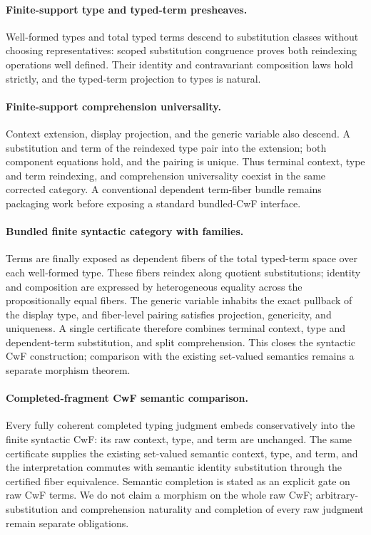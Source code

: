 \documentclass[11pt]{article}
\theoremstyle{definition}
\begin{document}
\paragraph{Finite-support type and typed-term presheaves.}
Well-formed types and total typed terms descend to substitution classes without
choosing representatives: scoped substitution congruence proves both
reindexing operations well defined. Their identity and contravariant
composition laws hold strictly, and the typed-term projection to types is
natural.

\paragraph{Finite-support comprehension universality.}
Context extension, display projection, and the generic variable also descend.
A substitution and term of the reindexed type pair into the extension; both
component equations hold, and the pairing is unique. Thus terminal context,
type and term reindexing, and comprehension universality coexist in the same
corrected category. A conventional dependent term-fiber bundle remains
packaging work before exposing a standard bundled-CwF interface.

\paragraph{Bundled finite syntactic category with families.}
Terms are finally exposed as dependent fibers of the total typed-term space
over each well-formed type. These fibers reindex along quotient substitutions;
identity and composition are expressed by heterogeneous equality across the
propositionally equal fibers. The generic variable inhabits the exact pullback
of the display type, and fiber-level pairing satisfies projection, genericity,
and uniqueness. A single certificate therefore combines terminal context,
type and dependent-term substitution, and split comprehension. This closes the
syntactic CwF construction; comparison with the existing set-valued semantics
remains a separate morphism theorem.

\paragraph{Completed-fragment CwF semantic comparison.}
Every fully coherent completed typing judgment embeds conservatively into the
finite syntactic CwF: its raw context, type, and term are unchanged. The same
certificate supplies the existing set-valued semantic context, type, and term,
and the interpretation commutes with semantic identity substitution through
the certified fiber equivalence. Semantic completion is stated as an explicit
gate on raw CwF terms. We do not claim a morphism on the whole raw CwF;
arbitrary-substitution and comprehension naturality and completion of every raw
judgment remain separate obligations.
\end{document}
